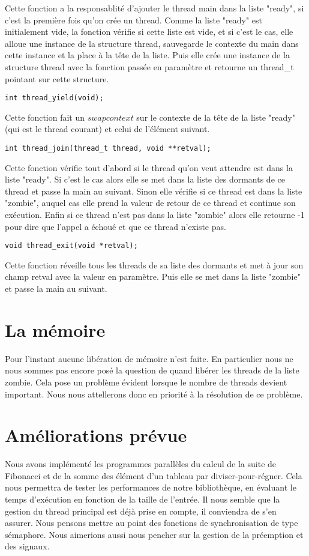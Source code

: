 \documentclass[12pt]{article}
\begin{document}
Cette fonction a la responsablité d'ajouter le thread main dans la
liste "ready", si c'est la première fois qu'on crée un thread.  Comme
la liste "ready" est initialement vide, la fonction vérifie si cette
liste est vide, et si c'est le cas, elle alloue une instance de la
structure thread, sauvegarde le contexte du main dans cette instance
et la place à la tête de la liste.  Puis elle crée une instance de la
structure thread avec la fonction passée en paramètre et retourne un
thread\_t pointant sur cette structure.  ~~\\
\begin{verbatim}
int thread_yield(void);
\end{verbatim}
Cette fonction fait un $swapcontext$ sur le contexte de la tête de la
liste "ready" (qui est le thread courant) et celui de l'élément
suivant.  ~~\\
\begin{verbatim}
int thread_join(thread_t thread, void **retval);
\end{verbatim}
Cette fonction vérifie tout d'abord si le thread qu'on veut attendre
est dans la liste "ready". Si c'est le cas alors elle se met dans la
liste des dormants de ce thread et passe la main au suivant.  Sinon
elle vérifie si ce thread est dans la liste "zombie", auquel cas 
elle prend la valeur de retour de ce thread et continue son exécution.
Enfin si ce thread n'est pas dans la liste "zombie" alors elle
retourne -1 pour dire que l'appel a échoué et que ce thread n'existe
pas.  ~~\\
\begin{verbatim}
void thread_exit(void *retval);
\end{verbatim}
Cette fonction réveille tous les threads de sa liste des dormants et
met à jour son champ retval avec la valeur en paramètre. Puis elle se
met dans la liste "zombie" et passe la main au suivant.

\section{La mémoire}
Pour l'instant aucune libération de mémoire n'est faite. En
particulier nous ne nous sommes pas encore posé la question de quand
libérer les threads de la liste zombie. Cela pose un problème
évident lorsque le nombre de threads devient important. Nous nous
attellerons donc en priorité à la résolution de ce problème.

\section{Améliorations prévue}
Nous avons implémenté les programmes parallèles du calcul de la suite
de Fibonacci et de la somme des élément d'un tableau par
diviser-pour-régner. Cela nous permettra de tester les performances de
notre bibliothèque, en évaluant le temps d'exécution en fonction de la
taille de l'entrée. Il nous semble que la gestion du thread principal
est déjà prise en compte, il conviendra de s'en assurer. Nous pensons
mettre au point des fonctions de synchronisation de type
sémaphore. Nous aimerions aussi nous pencher sur la gestion de la
préemption et des signaux.
\end{document}
